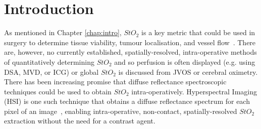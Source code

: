 
% 
\section{Introduction}\label{sec:intro}
As mentioned in Chapter \ref{chap:intro}, $StO_2$ 
is a key metric that could be used in surgery to determine tissue viability, tumour localisation, and vessel flow~\citep{Takami2017, Hughes2019, Richardson2023}.
There are, however, no currently established, spatially-resolved, intra-operative methods of quantitatively determining $StO_2$ and so perfusion is often displayed (e.g. using DSA, MVD, or ICG) or global $StO_2$ is discussed from JVOS or cerebral oximetry.
There has been increasing promise that diffuse reflectance spectroscopic techniques could be used to obtain $StO_2$ intra-operatively. Hyperspectral Imaging (HSI) is one such technique that obtains a diffuse reflectance spectrum for each pixel of an image~\citep{Kulcke2018, Taylor-Williams2022}, enabling intra-operative, non-contact, spatially-resolved $StO_2$ extraction without the need for a contrast agent. 

